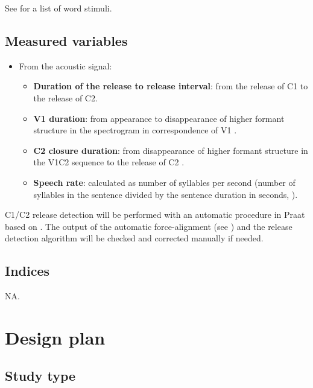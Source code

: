 \documentclass[11pt,]{article}
\providecommand{\tightlist}{%
  \setlength{\itemsep}{0pt}\setlength{\parskip}{0pt}}
\begin{document}
See  for a list of word stimuli.

\hypertarget{measured-variables}{%
\subsection{Measured variables}\label{measured-variables}}

\begin{itemize}
\tightlist
\item
  From the acoustic signal:

  \begin{itemize}
  \tightlist
  \item
    \textbf{Duration of the release to release interval}: from the
    release of C1 to the release of C2.
  \item
    \textbf{V1 duration}: from appearance to disappearance of higher
    formant structure in the spectrogram in correspondence of V1
    \citep{machac2009}.
  \item
    \textbf{C2 closure duration}: from disappearance of higher formant
    structure in the V1C2 sequence to the release of C2
    \citep{machac2009}.
  \item
    \textbf{Speech rate}: calculated as number of syllables per second
    (number of syllables in the sentence divided by the sentence
    duration in seconds, \citealt{plug2018}).
  \end{itemize}
\end{itemize}

C1/C2 release detection will be performed with an automatic procedure in
Praat based on \citet{ananthapadmanabha2014}. The output of the
automatic force-alignment (see ) and the release
detection algorithm will be checked and corrected manually if needed.

\hypertarget{indices}{%
\subsection{Indices}\label{indices}}

NA.

\hypertarget{design-plan}{%
\section{Design plan}\label{design-plan}}

\hypertarget{study-type}{%
\subsection{Study type}\label{study-type}}
\end{document}
